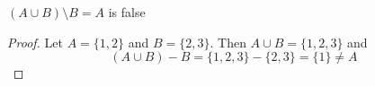 \setcounter{question}{6}  %
\begin{question}[Ewing]
  $(A \cup B) \setminus B = A$ is false
\end{question}

\begin{proof}
  Let $A=\{1, 2\}$ and $B=\{2, 3\}$. Then $A\cup B=\{1,2,3\}$ and
  $$(A\cup B)-B=\{1,2,3\}-\{2,3\}=\{1\}\ne A$$
\end{proof}

